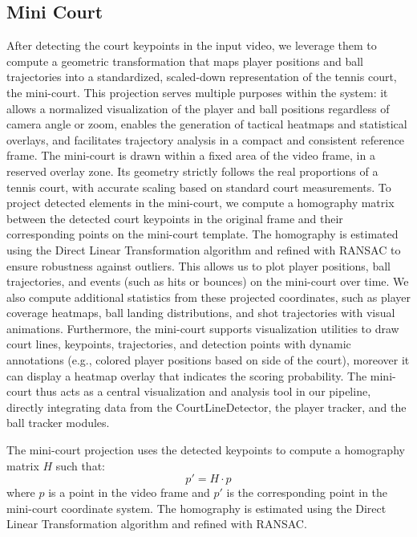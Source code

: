 \subsection{Mini Court}
After detecting the court keypoints in the input video, we leverage them to compute a geometric transformation that maps player positions and ball trajectories into a standardized, scaled-down representation of the tennis court, the mini-court.
This projection serves multiple purposes within the system: it allows a normalized visualization of the player and ball positions regardless of camera angle or zoom, enables the generation of tactical heatmaps and statistical overlays, and facilitates trajectory analysis in a compact and consistent reference frame.
The mini-court is drawn within a fixed area of the video frame, in a reserved overlay zone. Its geometry strictly follows the real proportions of a tennis court, with accurate scaling based on standard court measurements.
To project detected elements in the mini-court, we compute a homography matrix between the detected court keypoints in the original frame and their corresponding points on the mini-court template. The homography is estimated using the Direct Linear Transformation algorithm and refined with RANSAC to ensure robustness against outliers.
This allows us to plot player positions, ball trajectories, and events (such as hits or bounces) on the mini-court over time. We also compute additional statistics from these projected coordinates, such as player coverage heatmaps, ball landing distributions, and shot trajectories with visual animations.
Furthermore, the mini-court supports visualization utilities to draw court lines, keypoints, trajectories, and detection points with dynamic annotations (e.g., colored player positions based on side of the court), moreover it can display a heatmap overlay that indicates the scoring probability.
The mini-court thus acts as a central visualization and analysis tool in our pipeline, directly integrating data from the CourtLineDetector, the player tracker, and the ball tracker modules.

The mini-court projection uses the detected keypoints to compute a homography matrix $H$ such that:
\[
 p' = H \cdot p
\]
where $p$ is a point in the video frame and $p'$ is the corresponding point in the mini-court coordinate system. The homography is estimated using the Direct Linear Transformation algorithm and refined with RANSAC.



